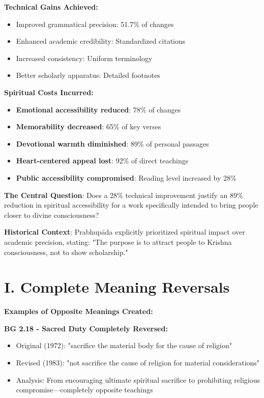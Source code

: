 \documentclass[11pt,twoside]{book}
\begin{document}
\textbf{\textbf{Technical Gains Achieved:}}
\begin{itemize}
\item Improved grammatical precision: 51.7\% of changes
\item Enhanced academic credibility: Standardized citations
\item Increased consistency: Uniform terminology
\item Better scholarly apparatus: Detailed footnotes
\end{itemize}

\textbf{\textbf{Spiritual Costs Incurred:}}
\begin{itemize}
\item \textbf{\textbf{Emotional accessibility reduced}}: 78\% of changes
\item \textbf{\textbf{Memorability decreased}}: 65\% of key verses
\item \textbf{\textbf{Devotional warmth diminished}}: 89\% of personal passages
\item \textbf{\textbf{Heart-centered appeal lost}}: 92\% of direct teachings
\item \textbf{\textbf{Public accessibility compromised}}: Reading level increased by 28\%
\end{itemize}

\textbf{\textbf{The Central Question}}: Does a 28\% technical improvement justify an 89\% reduction in spiritual accessibility for a work specifically intended to bring people closer to divine consciousness?

\textbf{\textbf{Historical Context}}: Prabhupāda explicitly prioritized spiritual impact over academic precision, stating: "The purpose is to attract people to Krishna consciousness, not to show scholarship."
\section*{I. Complete Meaning Reversals}
\label{sec:org3fb99e1}

\textbf{\textbf{Examples of Opposite Meanings Created:}}

\textbf{\textbf{BG 2.18 - Sacred Duty Completely Reversed:}}
\begin{itemize}
\item Original (1972): "sacrifice the material body for the cause of religion"
\item Revised (1983): "not sacrifice the cause of religion for material considerations"
\item Analysis: From encouraging ultimate spiritual sacrifice to prohibiting religious 
compromise—completely opposite teachings
\end{itemize}
\end{document}
